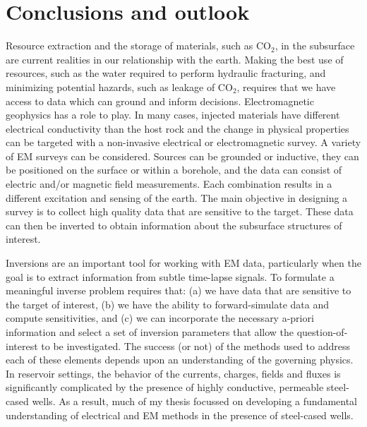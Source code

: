 \chapter{Conclusions and outlook}
\label{ch:conclusion}

Resource extraction and the storage of materials, such as CO$_2$, in the subsurface are current realities in our relationship with the earth. Making the best use of resources, such as the water required to perform hydraulic fracturing, and minimizing potential hazards, such as leakage of CO$_2$, requires that we have access to data which can ground and inform decisions. Electromagnetic geophysics has a role to play. In many cases, injected materials have different electrical conductivity than the host rock and the change in physical properties can be targeted with a non-invasive electrical or electromagnetic survey. A variety of EM surveys can be considered. Sources can be grounded or inductive, they can be positioned on the surface or within a borehole, and the data can consist of electric and/or magnetic field measurements. Each combination results in a different excitation and sensing of the earth. The main objective in designing a survey is to collect high quality data that are sensitive to the target. These data can then be inverted to obtain information about the subsurface structures of interest.

Inversions are an important tool for working with EM data, particularly when the goal is to extract information from subtle time-lapse signals. To formulate a meaningful inverse problem requires that: (a) we have data that are sensitive to the target of interest, (b) we have the ability to forward-simulate data and compute sensitivities, and (c) we can incorporate the necessary a-priori information and select a set of inversion parameters that allow the question-of-interest to be investigated. The success (or not) of the methods used to address each of these elements depends upon an understanding of the governing physics. In reservoir settings, the behavior of the currents, charges, fields and fluxes is significantly complicated by the presence of highly conductive, permeable steel-cased wells. As a result, much of my thesis focussed on developing a fundamental understanding of electrical and EM methods in the presence of steel-cased wells.

